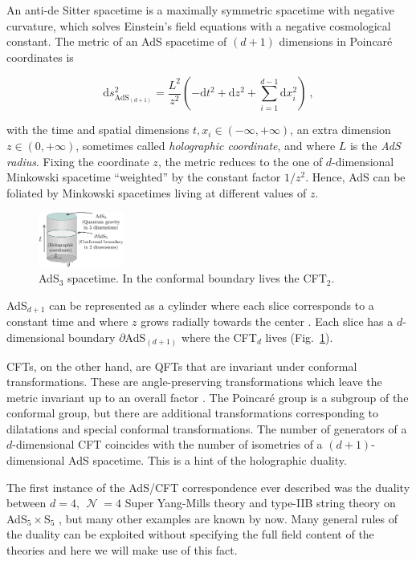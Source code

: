 \documentclass[twocolumn]{revtex4}
\providecommand{\eq}[2]{
    \begin{equation}
        #2
    \label{eq:#1}
    \end{equation}
}
\DeclareMathOperator{\calN}{\mathcal{N}}
\begin{document}
An anti-de Sitter spacetime is a maximally symmetric spacetime with negative curvature, which solves Einstein's field equations with a negative cosmological constant. The metric of an AdS spacetime of $(d+1)$ dimensions in Poincar\'e coordinates is 
\eq{AdS_PP-metric}{
    \mathrm{d} s_{\text{AdS}_{(d+1)}}^2 = \frac{L^2}{z^2} \left( -\mathrm{d} t^2 + \mathrm{d} z^2 + \sum_{i=1}^{d-1} \mathrm{d} x_i^2 \right) \ ,
}
with the time and spatial dimensions $t , x_i \in (-\infty,+\infty)$, an extra dimension $z \in (0,+\infty)$, sometimes called \emph{holographic coordinate}, and where $L$ is the \emph{AdS radius}. Fixing the coordinate $z$, the metric reduces to the one of $d$-dimensional Minkowski spacetime ``weighted'' by the constant factor $1/z^2$. Hence, AdS can be foliated by Minkowski spacetimes living at different values of $z$.


\begin{figure}
    \centering
    \includegraphics[width=0.25\textwidth]{../imatges/AdS_Cylindric.png}
\caption{AdS$_3$ spacetime. In the conformal boundary lives the CFT$_2$.}
\label{fig:AdS}
\end{figure}

AdS$_{d+1}$ can be represented as a cylinder where each slice corresponds to a constant time and where  $z$ grows radially towards the center \cite{hawking_large_2008}. Each slice has a $d$-dimensional boundary $\partial$AdS$_{(d+1)}$ where the CFT$_d$ lives (Fig.~\ref{fig:AdS}).

CFTs, on the other hand, are QFTs that are invariant under conformal transformations. These are angle-preserving transformations which leave the metric invariant up to an overall factor \cite{di_francesco_conformal_1997}. The Poincar\'e group is a subgroup of the conformal group, but there are additional transformations corresponding to dilatations and special conformal transformations. The number of generators of a $d$-dimensional CFT coincides with the number of isometries of a $(d+1)$-dimensional AdS spacetime. This is a hint of the holographic duality.

The first instance of the AdS/CFT correspondence ever described was the duality between $d=4$, $\calN=4$ Super Yang-Mills theory and type-IIB string theory on AdS$_5 \times $S$_5$ \cite{maldacena_large_1999}, but many other examples are known by now. Many general rules of the duality can be exploited without specifying the full field content of the theories and here we will make use of this fact.
\end{document}
